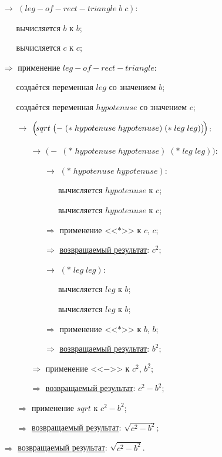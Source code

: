 \begin{itemize}
	\item[$\longrightarrow$] $(leg\!-\!of\!-\!rect\!-\!triangle\; b\; c)$:
	\begin{itemize}
		\item[\textbullet] вычисляется $b$ к $b$;
		\item[\textbullet] вычисляется $c$ к $c$;
	\end{itemize}
	\item[$\Longrightarrow$] применение $leg\!-\!of\!-\!rect\!-\!triangle$:
	\begin{itemize}
		\item[\textbullet] создаётся переменная $leg$ со значением $b$;
		\item[\textbullet] создаётся переменная $hypotenuse$ со значением $c$;
		\item[$\longrightarrow$] $\Bigl(\!sqrt\; \bigl(-\; (*\; hypotenuse\; hypotenuse)\; (*\; leg\; leg)\bigr)\!\Bigr)$:
		\begin{itemize}
			\item[$\longrightarrow$] $\bigl(-\; (*\; hypotenuse\; hypotenuse)\; (*\; leg\; leg)\bigr)$:
			\begin{itemize}
				\item[$\longrightarrow$] $(*\; hypotenuse\; hypotenuse)$:
				\begin{enumerate}
					\item[\textbullet] вычисляется $hypotenuse$ к $c$;
					\item[\textbullet] вычисляется $hypotenuse$ к $c$;
				\end{enumerate}
				\item[$\Longrightarrow$] применение <<$*$>> к $c$, $c$;
				\item[$\Longrightarrow$] \underline{возвращаемый результат}: $c^2$;
				\item[$\longrightarrow$] $(*\; leg\; leg)$:
				\begin{enumerate}
					\item[\textbullet] вычисляется $leg$ к $b$;
					\item[\textbullet] вычисляется $leg$ к $b$;
				\end{enumerate}
				\item[$\Longrightarrow$] применение <<$*$>> к $b$, $b$;
				\item[$\Longrightarrow$] \underline{возвращаемый результат}: $b^2$;
			\end{itemize}
			\item[$\Longrightarrow$] применение <<$-$>> к $c^2$, $b^2$;
			\item[$\Longrightarrow$] \underline{возвращаемый результат}: $c^2 - b^2$;
		\end{itemize}
		\item[$\Longrightarrow$] применение $sqrt$ к $c^2 - b^2$;
		\item[$\Longrightarrow$] \underline{возвращаемый результат}: $\sqrt{c^2 - b^2}$;
	\end{itemize}
	\item[$\Longrightarrow$] \underline{возвращаемый результат}: $\sqrt{c^2 - b^2}$.
\end{itemize}


